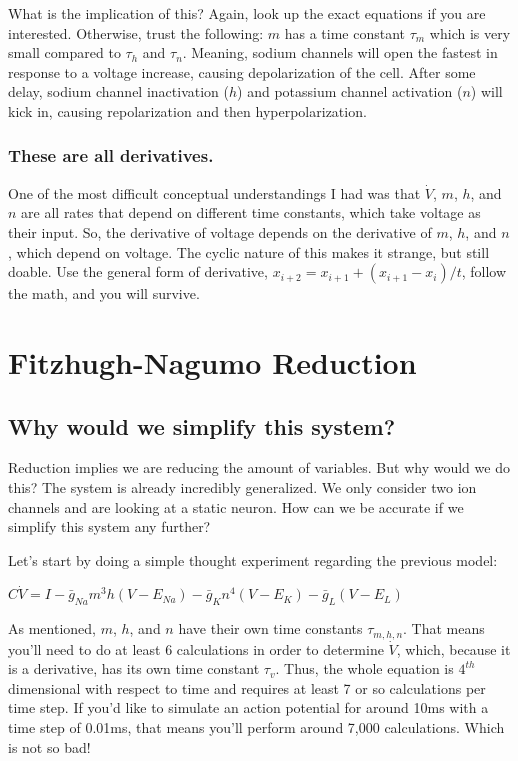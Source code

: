 \documentclass[12pt]{report}
\begin{document}
What is the implication of this? Again, look up the exact equations if you are interested. Otherwise, trust the following: $m$ has a time constant $\tau_m$ which is very small compared to $\tau_h$ and $\tau_n$. Meaning, sodium channels will open the fastest in response to a voltage increase, causing depolarization of the cell. After some delay, sodium channel inactivation ($h$) and potassium channel activation ($n$) will kick in, causing repolarization and then hyperpolarization. 

\subsubsection{These are all derivatives.}
One of the most difficult conceptual understandings I had was that $\dot{V}$, $m$, $h$, and $n$ are all rates that depend on different time constants, which take voltage as their input. So, the derivative of voltage depends on the derivative of $m$, $h$, and $n$, which depend on voltage. The cyclic nature of this makes it strange, but still doable. Use the general form of derivative, $x_{i+2} = x_{i+1} + (x_{i+1} - x_i)/t$, follow the math, and you will survive.

\section{Fitzhugh-Nagumo Reduction}

\subsection{Why would we simplify this system?} Reduction implies we are reducing the amount of variables. But why would we do this? The system is already incredibly generalized. We only consider two ion channels and are looking at a static neuron. How can we be accurate if we simplify this system any further?\newline

Let's start by doing a simple thought experiment regarding the previous model: 

\bigskip

\begin{center}

    $C\dot{V} = I - \bar{g}_{Na}m^3h(V - E_{Na}) - \bar{g}_{K}n^4(V - E_{K}) - \bar{g}_{L}(V - E_{L})$
    
\end{center}

\bigskip

As mentioned, $m$, $h$, and $n$ have their own time constants $\tau_{m,h,n}$. That means you'll need to do at least 6 calculations in order to determine $\dot{V}$, which, because it is a derivative, has its own time constant $\tau_v$. Thus, the whole equation is $4^{th}$ dimensional with respect to time and requires at least 7 or so calculations per time step. If you'd like to simulate an action potential for around 10ms with a time step of 0.01ms, that means you'll perform around 7,000 calculations. Which is not so bad!\newline 
\end{document}
